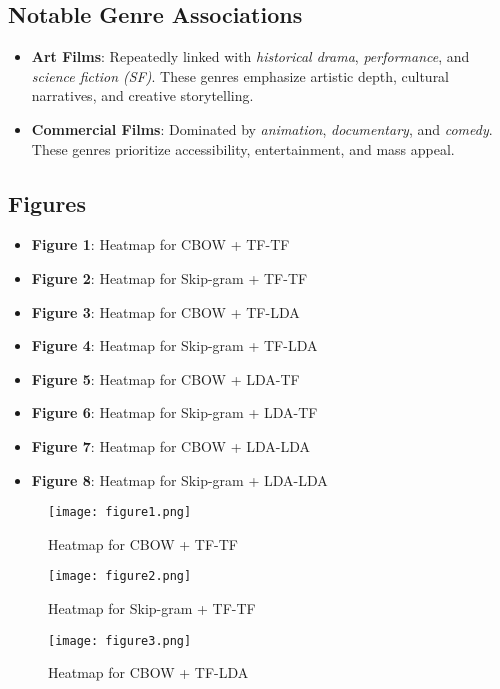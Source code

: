 \documentclass[conference]{IEEEtran}
\begin{document}
\subsection{Notable Genre Associations}
\begin{itemize}
    \item \textbf{Art Films}: Repeatedly linked with \textit{historical drama}, \textit{performance}, and \textit{science fiction (SF)}. These genres emphasize artistic depth, cultural narratives, and creative storytelling.
    \item \textbf{Commercial Films}: Dominated by \textit{animation}, \textit{documentary}, and \textit{comedy}. These genres prioritize accessibility, entertainment, and mass appeal.
\end{itemize}

\subsection{Figures}
\begin{itemize}
    \item \textbf{Figure 1}: Heatmap for CBOW + TF-TF
    \item \textbf{Figure 2}: Heatmap for Skip-gram + TF-TF
    \item \textbf{Figure 3}: Heatmap for CBOW + TF-LDA
    \item \textbf{Figure 4}: Heatmap for Skip-gram + TF-LDA
    \item \textbf{Figure 5}: Heatmap for CBOW + LDA-TF
    \item \textbf{Figure 6}: Heatmap for Skip-gram + LDA-TF
    \item \textbf{Figure 7}: Heatmap for CBOW + LDA-LDA
    \item \textbf{Figure 8}: Heatmap for Skip-gram + LDA-LDA
\end{itemize}

\begin{figure}[htbp]
    \centering
    \texttt{[image: figure1.png]}
    \caption{Heatmap for CBOW + TF-TF}
    \label{fig:cbow-tf-tf}
\end{figure}

\begin{figure}[htbp]
    \centering
    \texttt{[image: figure2.png]}
    \caption{Heatmap for Skip-gram + TF-TF}
    \label{fig:skipgram-tf-tf}
\end{figure}

\begin{figure}[htbp]
    \centering
    \texttt{[image: figure3.png]}
    \caption{Heatmap for CBOW + TF-LDA}
    \label{fig:cbow-tf-lda}
\end{figure}
\end{document}
